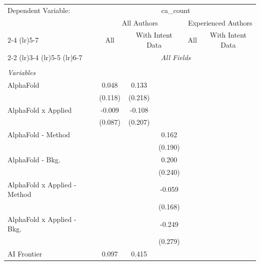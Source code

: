 \begingroup
\centering
\begin{tabular}{lcccccc}
   \tabularnewline \midrule \midrule
   Dependent Variable: & \multicolumn{6}{c}{ca\_count}\\
 & \multicolumn{3}{c}{All Authors} & \multicolumn{3}{c}{Experienced Authors} \\
\cmidrule(lr){2-4} \cmidrule(lr){5-7}
 & \multicolumn{1}{c}{All} & \multicolumn{2}{c}{With Intent Data} & \multicolumn{1}{c}{All} & \multicolumn{2}{c}{With Intent Data} \\
\cmidrule(lr){2-2} \cmidrule(lr){3-4} \cmidrule(lr){5-5} \cmidrule(lr){6-7}
 & \multicolumn{6}{c}{\textit{All Fields}} \\ \\
   \emph{Variables}\\
   AlphaFold                      & 0.048     & 0.133   &              &        &        &   \\   
                                  & (0.118)   & (0.218) &              &        &        &   \\   
   AlphaFold x Applied            & -0.009    & -0.108  &              &        &        &   \\   
                                  & (0.087)   & (0.207) &              &        &        &   \\   
   AlphaFold - Method             &           &         & 0.162        &        &        &   \\   
                                  &           &         & (0.190)      &        &        &   \\   
   AlphaFold - Bkg.               &           &         & 0.200        &        &        &   \\   
                                  &           &         & (0.240)      &        &        &   \\   
   AlphaFold x Applied - Method   &           &         & -0.059       &        &        &   \\   
                                  &           &         & (0.168)      &        &        &   \\   
   AlphaFold x Applied - Bkg.     &           &         & -0.249       &        &        &   \\   
                                  &           &         & (0.279)      &        &        &   \\   
   AI Frontier                    & 0.097     & 0.415   &              &        &        &   \\   

\end{tabular}
